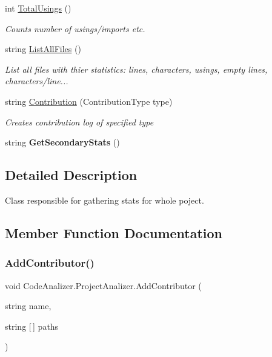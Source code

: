 \begin{DoxyCompactItemize}
int \mbox{\hyperlink{class_code_analizer_1_1_project_analizer_a6b4d14436cbf5a7bdfe24870fe2209d7}{Total\+Usings}} ()
\begin{DoxyCompactList}\small\item\em Counts number of usings/imports etc. \end{DoxyCompactList}\item 
string \mbox{\hyperlink{class_code_analizer_1_1_project_analizer_acf4aae301520f5a14168668007c39cf6}{List\+All\+Files}} ()
\begin{DoxyCompactList}\small\item\em List all files with thier statistics\+: lines, characters, usings, empty lines, characters/line... \end{DoxyCompactList}\item 
string \mbox{\hyperlink{class_code_analizer_1_1_project_analizer_a1403b55c5ff8ed558878246b5ff67ed1}{Contribution}} (Contribution\+Type type)
\begin{DoxyCompactList}\small\item\em Creates contribution log of specified type \end{DoxyCompactList}\item 
\mbox{\label{class_code_analizer_1_1_project_analizer_ac507d064d9f31ae8982fa683a7339488}} 
string {\bfseries Get\+Secondary\+Stats} ()
\end{DoxyCompactItemize}


\subsection{Detailed Description}
Class responsible for gathering stats for whole poject. 



\subsection{Member Function Documentation}
\mbox{\label{class_code_analizer_1_1_project_analizer_a211cc82430d4b716fde6425c3d919be3}} 
\subsubsection{\texorpdfstring{Add\+Contributor()}{AddContributor()}}
{\footnotesize\ttfamily void Code\+Analizer.\+Project\+Analizer.\+Add\+Contributor (\begin{DoxyParamCaption}\item[{string}]{name,  }\item[{string \mbox{[}$\,$\mbox{]}}]{paths }\end{DoxyParamCaption})}



